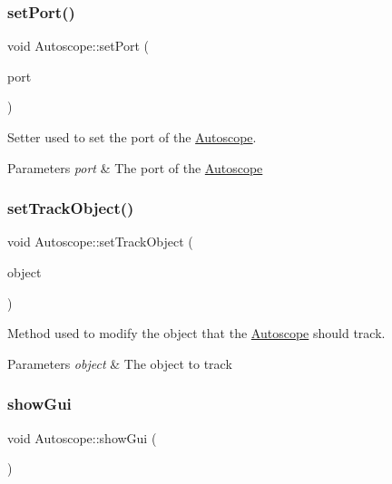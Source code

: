 \subsubsection{\texorpdfstring{setPort()}{setPort()}}
{\footnotesize\ttfamily void Autoscope\+::set\+Port (\begin{DoxyParamCaption}\item[{int}]{port }\end{DoxyParamCaption})\hspace{0.3cm}{\ttfamily [inline]}}



Setter used to set the port of the \mbox{\hyperlink{class_autoscope}{Autoscope}}. 


\begin{DoxyParams}{Parameters}
{\em port} & The port of the \mbox{\hyperlink{class_autoscope}{Autoscope}} \\
\hline
\end{DoxyParams}
\mbox{\label{class_autoscope_a0a616d2998641471cb6785e2abb6e7b5}} 
\subsubsection{\texorpdfstring{setTrackObject()}{setTrackObject()}}
{\footnotesize\ttfamily void Autoscope\+::set\+Track\+Object (\begin{DoxyParamCaption}\item[{Stel\+ObjectP}]{object }\end{DoxyParamCaption})}



Method used to modify the object that the \mbox{\hyperlink{class_autoscope}{Autoscope}} should track. 


\begin{DoxyParams}{Parameters}
{\em object} & The object to track \\
\hline
\end{DoxyParams}
\mbox{\label{class_autoscope_a2a3fc7df788580d91949351f687eab7a}} 
\subsubsection{\texorpdfstring{showGui}{showGui}}
{\footnotesize\ttfamily void Autoscope\+::show\+Gui (\begin{DoxyParamCaption}\item[{void}]{ }\end{DoxyParamCaption})\hspace{0.3cm}{\ttfamily [slot]}}




